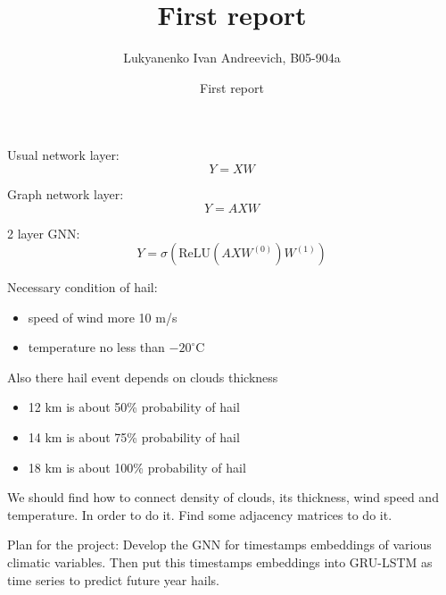 \documentclass{beamer}
\title[] %
{First report}
\subtitle{}
\author[Lukyanenko I. A.] %
{Lukyanenko Ivan Andreevich, B05-904a}
\institute[MIPT] %
{
  MIPT student FPMI 3 course
}
\date[March 8, 2022] %
{First report}
\begin{document}
\begin{frame}
    \begin{block}{Usual network layer:}
        \begin{equation*}
            Y = XW
        \end{equation*}
    \end{block}
    \begin{block}{Graph network layer:}
        \begin{equation*}
            Y = AXW
        \end{equation*}
    \end{block}
    \begin{block}{2 layer GNN:}
        \begin{equation*}
            Y = \sigma(\text{ReLU}(AXW^{(0)})W^{(1)})
        \end{equation*}
    \end{block}
\end{frame}

\begin{frame}
    Necessary condition of hail:
    \begin{itemize}
        \item speed of wind more 10 m/s
        \item temperature no less than $-20^{\circ}$C
    \end{itemize}
    Also there hail event depends on clouds thickness
    \begin{itemize}
        \item 12 km is about 50\% probability of hail
        \item 14 km is about 75\% probability of hail
        \item 18 km is about 100\% probability of hail
    \end{itemize}
    We should find how to connect density of clouds, its thickness, wind speed and temperature.
    In order to do it. Find some adjacency matrices to do it.
\end{frame}
\begin{frame}
    Plan for the project:
    Develop the GNN for timestamps embeddings of various climatic variables.
    Then put this timestamps embeddings into GRU-LSTM as time series to predict future year hails.
\end{frame}
\end{document}

